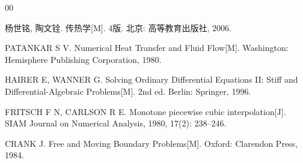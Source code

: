 \begin{thebibliography}{00}

杨世铭, 陶文铨. 传热学[M]. 4版. 北京: 高等教育出版社, 2006.

PATANKAR S V. Numerical Heat Transfer and Fluid Flow[M]. Washington: Hemisphere Publishing Corporation, 1980.

HAIRER E, WANNER G. Solving Ordinary Differential Equations II: Stiff and Differential-Algebraic Problems[M]. 2nd ed. Berlin: Springer, 1996.

FRITSCH F N, CARLSON R E. Monotone piecewise cubic interpolation[J]. SIAM Journal on Numerical Analysis, 1980, 17(2): 238--246.

CRANK J. Free and Moving Boundary Problems[M]. Oxford: Clarendon Press, 1984.

\end{thebibliography}
